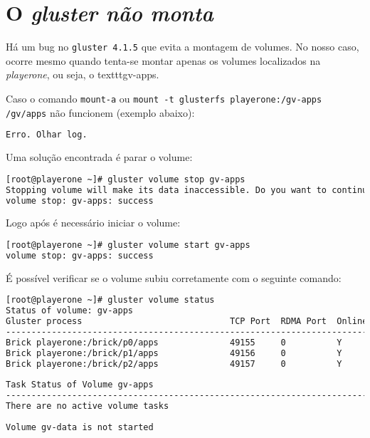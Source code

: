 \chapter{O \textit{gluster não monta}}

Há um bug no \texttt{gluster 4.1.5} que evita a montagem de volumes.
No nosso caso, ocorre mesmo quando tenta-se montar apenas os volumes localizados na \textit{playerone}, ou seja, o texttt{gv-apps}.

Caso o comando \texttt{mount-a} ou \texttt{mount -t glusterfs playerone:/gv-apps /gv/apps} não funcionem (exemplo abaixo):

\begin{lstlisting}[language=bash,basicstyle=\small]
  Erro. Olhar log.
\end{lstlisting}

Uma solução encontrada é parar o volume:

\begin{lstlisting}[language=bash,basicstyle=\small]
[root@playerone ~]# gluster volume stop gv-apps
Stopping volume will make its data inaccessible. Do you want to continue? (y/n) y
volume stop: gv-apps: success
\end{lstlisting}

Logo após é necessário iniciar o volume:

\begin{lstlisting}[language=bash,basicstyle=\small]
[root@playerone ~]# gluster volume start gv-apps
volume stop: gv-apps: success
\end{lstlisting}

É possível verificar se o volume subiu corretamente com o seguinte comando:

\begin{lstlisting}[language=bash,basicstyle=\small]
[root@playerone ~]# gluster volume status
Status of volume: gv-apps
Gluster process                             TCP Port  RDMA Port  Online  Pid
------------------------------------------------------------------------------
Brick playerone:/brick/p0/apps              49155     0          Y       22652
Brick playerone:/brick/p1/apps              49156     0          Y       22674
Brick playerone:/brick/p2/apps              49157     0          Y       22696
 
Task Status of Volume gv-apps
------------------------------------------------------------------------------
There are no active volume tasks
 
Volume gv-data is not started

\end{lstlisting}

